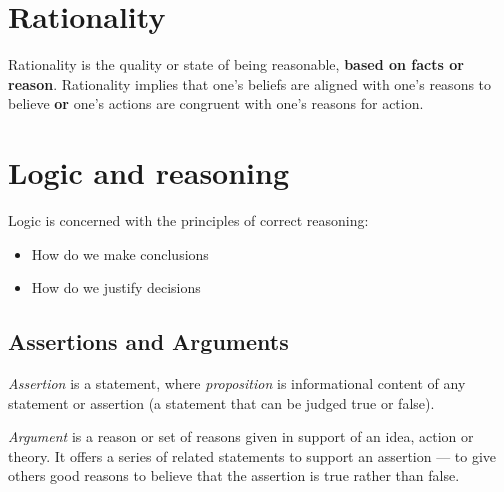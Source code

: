 \documentclass{article}
\begin{document}
\section{Rationality}
\begin{flushleft}
Rationality is the quality or state of being reasonable, \textbf{based on facts or reason}. Rationality implies that one's beliefs are aligned with one's reasons to believe \textbf{or} one's actions are congruent with one's reasons for action.
\end{flushleft}

\section{Logic and reasoning}
Logic is concerned with the principles of correct reasoning:
\begin{itemize}
  \item How do we make conclusions
  \item How do we justify decisions
\end{itemize}

\subsection{Assertions and Arguments}
\textit{Assertion} is a statement, where \textit{proposition} is informational content of any statement or assertion (a statement that can be judged true or false).
\begin{flushleft}
\textit{Argument} is a reason or set of reasons given in support of an idea, action or theory. It offers a series of related statements to support an assertion — to give others good reasons to believe that the assertion is true rather than false.
\end{flushleft}
\end{document}
